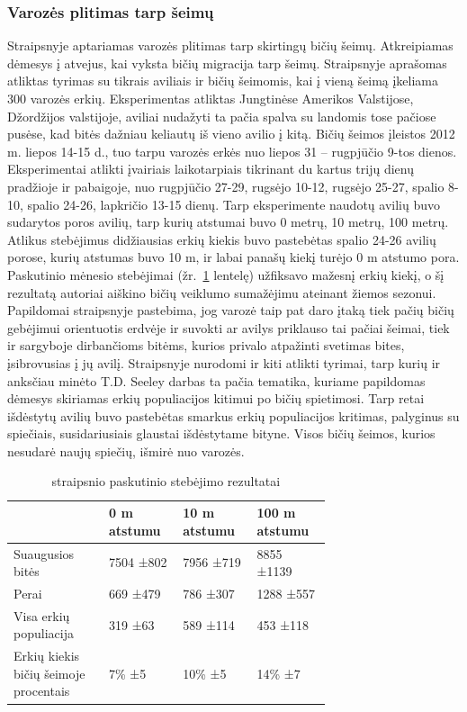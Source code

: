 \documentclass{VUMIFKompMagistrinis}
\begin{document}
\subsubsection{Varozės plitimas tarp šeimų}

Straipsnyje \cite{NoD17} aptariamas varozės plitimas tarp skirtingų bičių šeimų. Atkreipiamas dėmesys į atvejus, kai vyksta bičių migracija tarp šeimų. Straipsnyje aprašomas atliktas tyrimas su tikrais aviliais ir bičių šeimomis, kai į vieną šeimą įkeliama 300 varozės erkių. Eksperimentas atliktas Jungtinėse Amerikos Valstijose, Džordžijos valstijoje, aviliai nudažyti ta pačia spalva su landomis tose pačiose pusėse, kad bitės dažniau keliautų iš vieno avilio į kitą. Bičių šeimos įleistos 2012 m. liepos 14-15 d., tuo tarpu varozės erkės nuo liepos 31 – rugpjūčio 9-tos dienos. Eksperimentai atlikti įvairiais laikotarpiais tikrinant du kartus trijų dienų pradžioje ir pabaigoje, nuo rugpjūčio 27-29, rugsėjo 10-12, rugsėjo 25-27, spalio 8-10, spalio 24-26, lapkričio 13-15 dienų. Tarp eksperimente naudotų avilių buvo sudarytos poros avilių, tarp kurių atstumai buvo 0 metrų, 10 metrų, 100 metrų. Atlikus stebėjimus didžiausias erkių kiekis buvo pastebėtas spalio 24-26 avilių porose, kurių atstumas buvo 10 m, ir labai panašų kiekį turėjo 0 m atstumo pora. Paskutinio mėnesio stebėjimai (žr.~\ref{tab:tva} lentelę) užfiksavo mažesnį erkių kiekį, o šį rezultatą autoriai aiškino bičių veiklumo sumažėjimu ateinant žiemos sezonui.
Papildomai straipsnyje pastebima, jog varozė taip pat daro įtaką tiek pačių bičių gebėjimui orientuotis erdvėje ir suvokti ar avilys priklauso tai pačiai šeimai, tiek ir sargyboje dirbančioms bitėms, kurios privalo atpažinti svetimas bites, įsibrovusias į jų avilį. Straipsnyje nurodomi ir kiti atlikti tyrimai, tarp kurių ir anksčiau minėto T.D. Seeley \cite{SeS15} darbas ta pačia tematika, kuriame papildomas dėmesys skiriamas erkių populiacijos kitimui po bičių spietimosi. Tarp retai išdėstytų avilių buvo pastebėtas smarkus erkių populiacijos kritimas, palyginus su spiečiais, susidariusiais glaustai išdėstytame bityne. Visos bičių šeimos, kurios nesudarė naujų spiečių, išmirė nuo varozės.


\begin{table}[H]\footnotesize
\centering
\caption{\cite{NoD17} straipsnio paskutinio stebėjimo rezultatai}
\label{tab:tva}
\begin{tabular}{p{0.25\linewidth}p{0.15\linewidth}p{0.15\linewidth}p{0.15\linewidth}}
 & 0 m atstumu &	10 m atstumu &	100 m atstumu\\
\hline
Suaugusios bitės &	                    7504 ±802 &	    7956 ±719 &	    8855 ±1139\\
Perai&	                                669 ±479 &  	786 ±307 &	    1288 ±557\\
Visa erkių populiacija&	                319 ±63&	    589 ±114&	    453 ±118\\
Erkių kiekis bičių šeimoje procentais&	7\% ±5&     	10\% ±5&	    14\% ±7\\
\end{tabular}
\end{table}
\end{document}
